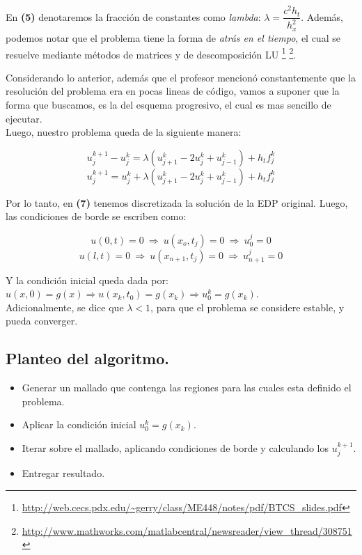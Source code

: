 \documentclass[12pt,letterpaper]{article}
\begin{document}
En \textbf{(5)} denotaremos la fracción de constantes como \textit{lambda}: $\lambda = \dfrac{c^2h_t}{h^2_x}$. Además, podemos notar que el problema tiene la forma de \textit{atrás en el tiempo}, el cual se resuelve mediante métodos de matrices y de descomposición LU \footnote{\url{http://web.cecs.pdx.edu/~gerry/class/ME448/notes/pdf/BTCS_slides.pdf}} \footnote{\url{http://www.mathworks.com/matlabcentral/newsreader/view_thread/308751}}.

Considerando lo anterior, además que el profesor mencionó constantemente que la resolución del problema era en pocas lineas de código, vamos a suponer que la forma que buscamos, es la del esquema progresivo, el cual es mas sencillo de ejecutar.\\

Luego, nuestro problema queda de la siguiente manera:

\begin{equation}u_j^{k+1} - u_j^k = \lambda (u_{j+1}^k - 2u_j^k + u_{j-1}^k) + h_tf_j^k\end{equation}
\begin{equation}u_j^{k+1} = u_j^k + \lambda (u_{j+1}^k - 2u_j^k + u_{j-1}^k) + h_tf_j^k\end{equation}

Por lo tanto, en \textbf{(7)} tenemos discretizada la solución de la EDP original. Luego, las condiciones de borde se escriben como:

\begin{equation*}u(0,t)=0\ \Rightarrow\ u(x_o,t_j)=0\ \Rightarrow\ u_0^j=0 \end{equation*}
\begin{equation*}u(l,t)=0\ \Rightarrow\ u(x_{n+1},t_j)=0\ \Rightarrow\ u_{n+1}^j=0 \end{equation*}

Y la condición inicial queda dada por: $u(x,0)=g(x) \Rightarrow u(x_k,t_0)=g(x_k) \Rightarrow u_0^k=g(x_k)$.\\

Adicionalmente, se dice que $\lambda<1$, para que el problema se considere estable, y pueda converger.

\subsection{Planteo del algoritmo.}
\begin{itemize}
	\item Generar un mallado que contenga las regiones para las cuales esta definido el problema.
	\item Aplicar la condición inicial $u_0^k=g(x_k)$.
	\item Iterar sobre el mallado, aplicando condiciones de borde y calculando los $u_j^{k+1}$.
	\item Entregar resultado.
\end{itemize}
\newpage
\end{document}

